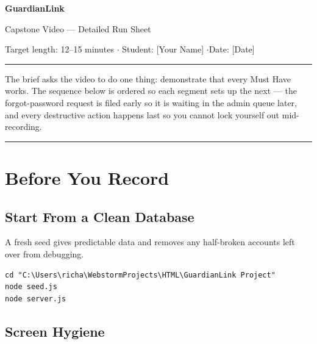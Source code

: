 \documentclass[11pt,letterpaper]{article}
\begin{document}
\begin{center}
{\LARGE\bfseries\color{glnavy} GuardianLink\par}
\vspace{4pt}
{\Large Capstone Video --- Detailed Run Sheet\par}
\vspace{8pt}
{\small Target length: 12--15 minutes \quad$\cdot$\quad
 Student: [Your Name] \quad$\cdot$\quad Date: [Date]\par}
\end{center}
\vspace{6pt}
\hrule
\vspace{14pt}

\noindent
The brief asks the video to do one thing: demonstrate that every Must Have
works. The sequence below is ordered so each segment sets up the next ---
the forgot-password request is filed early so it is waiting in the admin
queue later, and every destructive action happens last so you cannot lock
yourself out mid-recording.

\tableofcontents
\vspace{10pt}
\hrule

\section{Before You Record}

\subsection{Start From a Clean Database}

A fresh seed gives predictable data and removes any half-broken accounts
left over from debugging.

\begin{Verbatim}[fontsize=\small,xleftmargin=1.5em]
cd "C:\Users\richa\WebstormProjects\HTML\GuardianLink Project"
node seed.js
node server.js
\end{Verbatim}

\subsection{Screen Hygiene}
\end{document}
